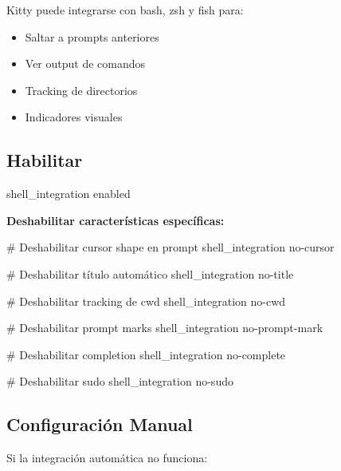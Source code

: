 \documentclass[
  doc,
  floatsintext,
  longtable,
  a4paper,
  nolmodern,
  notxfonts,
  notimes,
  12pt,
  colorlinks=true,linkcolor=blue,citecolor=blue,urlcolor=blue]{apa7}
\newenvironment{Shaded}{\begin{snugshade}}{\end{snugshade}}
\newcommand{\CommentTok}[1]{\textcolor[rgb]{0.37,0.37,0.37}{#1}}
\newcommand{\DataTypeTok}[1]{\textcolor[rgb]{0.68,0.00,0.00}{#1}}
\providecommand{\tightlist}{%
  \setlength{\itemsep}{0pt}\setlength{\parskip}{0pt}}
\begin{document}
Kitty puede integrarse con bash, zsh y fish para:

\begin{itemize}
\tightlist
\item
  Saltar a prompts anteriores
\item
  Ver output de comandos
\item
  Tracking de directorios
\item
  Indicadores visuales
\end{itemize}

\subsection{Habilitar}\label{habilitar}

\begin{Shaded}
\begin{Highlighting}[]
\DataTypeTok{shell\_integration} \DataTypeTok{enabled}
\end{Highlighting}
\end{Shaded}

\textbf{Deshabilitar características específicas:}

\begin{Shaded}
\begin{Highlighting}[]
\CommentTok{\# Deshabilitar cursor shape en prompt}
\DataTypeTok{shell\_integration} \DataTypeTok{no{-}cursor}

\CommentTok{\# Deshabilitar título automático}
\DataTypeTok{shell\_integration} \DataTypeTok{no{-}title}

\CommentTok{\# Deshabilitar tracking de cwd}
\DataTypeTok{shell\_integration} \DataTypeTok{no{-}cwd}

\CommentTok{\# Deshabilitar prompt marks}
\DataTypeTok{shell\_integration} \DataTypeTok{no{-}prompt{-}mark}

\CommentTok{\# Deshabilitar completion}
\DataTypeTok{shell\_integration} \DataTypeTok{no{-}complete}

\CommentTok{\# Deshabilitar sudo}
\DataTypeTok{shell\_integration} \DataTypeTok{no{-}sudo}
\end{Highlighting}
\end{Shaded}

\subsection{Configuración Manual}\label{configuraciuxf3n-manual}

Si la integración automática no funciona:
\end{document}
